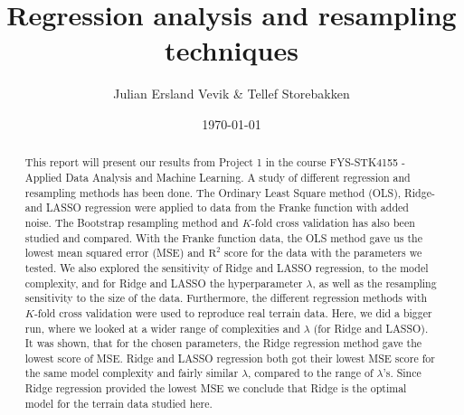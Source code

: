 \documentclass[norsk,a4paper,12pt]{article}
\title{Regression analysis and resampling techniques}
\author{Julian Ersland Vevik \& Tellef Storebakken}
\date{\today}
\begin{document}
\maketitle


\begin{abstract}

This report will present our results from Project 1 in the course FYS-STK4155 - Applied Data Analysis and Machine Learning.
A study of different regression and resampling methods has been done. The Ordinary Least Square method (OLS), Ridge- and LASSO regression were applied to data from the Franke function with added noise. The Bootstrap resampling method and $K$-fold cross validation has also been studied and compared. With the Franke function data, the OLS method gave us the lowest mean squared error (MSE) and $\mathrm{R}^2$ score for the data with the parameters we tested. We also explored the sensitivity of Ridge and LASSO regression, to the model complexity, and for Ridge and LASSO the hyperparameter $\lambda$, as well as the resampling sensitivity to the size of the data. 
Furthermore, the different regression methods with $K$-fold cross validation were used to reproduce real terrain data. Here, we did a bigger run, where we looked at a wider range of complexities and $\lambda$ (for Ridge and LASSO). It was shown, that for the chosen parameters, the Ridge regression method gave the lowest score of MSE. Ridge and LASSO regression both got their lowest MSE score for the same model complexity and fairly similar $\lambda$, compared to the range of $\lambda$'s. Since Ridge regression provided the lowest MSE we conclude that Ridge is the optimal model for the terrain data studied here.


\end{abstract}
\end{document}
